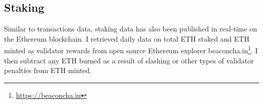 \documentclass[12pt]{article}
\begin{document}
\subsection{Staking}
Similar to transactions data, staking data has also been published in real-time on the Ethereum blockchain. I retrieved daily data on total ETH staked and ETH minted as validator rewards from open source Ethereum explorer beaconcha.in\footnote{\url{https://beaconcha.in}}. I then subtract any ETH burned as a result of slashing or other types of validator penalties from ETH minted.

\newpage
\printbibliography
\end{document}
